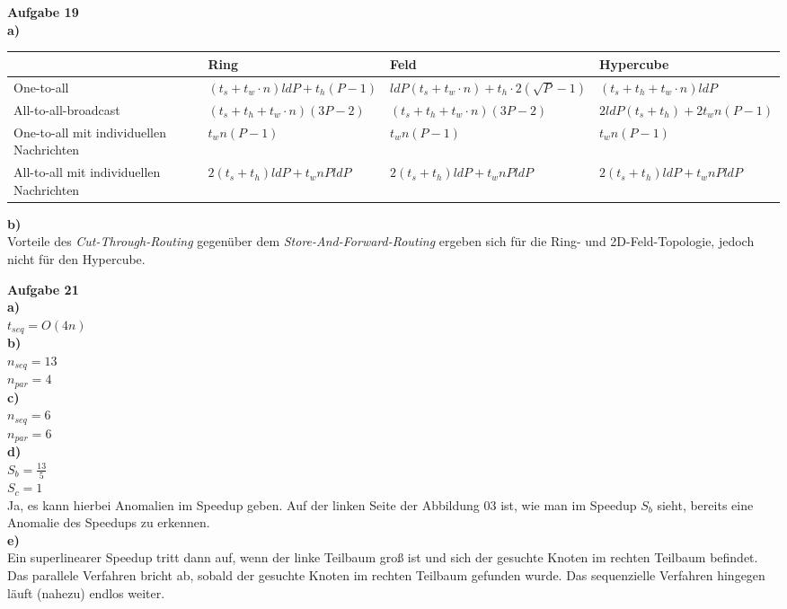 \documentclass{article}
\begin{document}
\pagestyle{myheadings}
{\bf Aufgabe 19}\\
{\bf a)}\\
\begin{tabularx}{\textwidth}{|X|X|X|X|}
\hline
 & Ring & Feld & Hypercube \\
\hline
One-to-all & $(t_s + t_w \cdot n) ld P + t_h(P-1)$ & $ld P(t_s + t_w \cdot n) + t_h \cdot 2(\sqrt{P}-1)$ & $(t_s+t_h+t_w \cdot n) ld P$ \\
\hline
All-to-all-broadcast & $(t_s + t_h + t_w \cdot n)(3P-2)$ & $(t_s + t_h + t_w \cdot n)(3P-2)$ & $2 ld P(t_s+t_h)+2t_wn(P-1)$ \\
\hline
One-to-all mit individuellen Nachrichten & $t_wn(P-1)$ & $t_wn(P-1)$ & $t_wn(P-1)$ \\
\hline
All-to-all mit individuellen Nachrichten & $2(t_s+t_h) ld P+t_wnP ld P$ & $2(t_s+t_h) ld P+t_wnP ld P$ & $2(t_s+t_h) ld P+t_wnP ld P$ \\
\hline
\end{tabularx}
{\bf b)}\\
Vorteile des \textit{Cut-Through-Routing} gegenüber dem \textit{Store-And-Forward-Routing} ergeben sich für die Ring- und 2D-Feld-Topologie, jedoch nicht für den Hypercube.

{\bf Aufgabe 21}\\
{\bf a)}\\
$t_{seq}=O(4n)$\\
{\bf b)}\\
$n_{seq}=13$\\
$n_{par}=4$\\
{\bf c)}\\
$n_{seq}=6$\\
$n_{par}=6$\\
{\bf d)}\\
$S_b = \frac{13}{5}$\\
$S_c = 1$\\
Ja, es kann hierbei Anomalien im Speedup geben. Auf der linken Seite der Abbildung 03 ist, wie man im Speedup $S_b$ sieht, bereits eine Anomalie des Speedups zu erkennen.\\
{\bf e)}\\
Ein superlinearer Speedup tritt dann auf, wenn der linke Teilbaum groß ist und sich der gesuchte Knoten im rechten Teilbaum befindet. Das parallele Verfahren bricht ab, sobald der gesuchte Knoten im rechten Teilbaum gefunden 
wurde. Das sequenzielle Verfahren hingegen läuft (nahezu) endlos weiter.
\end{document}
